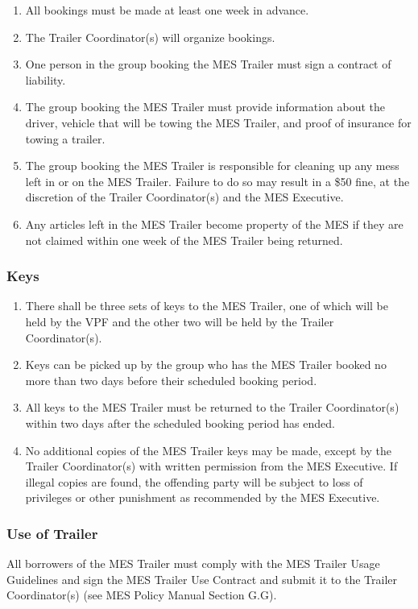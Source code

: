 \begin{enumerate}
 \item
  All bookings must be made at least one week in advance.
 \item
  The Trailer Coordinator(s) will organize bookings.
 \item
  One person in the group booking the MES Trailer must sign a contract
  of liability.
 \item
  The group booking the MES Trailer must provide information about the
  driver, vehicle that will be towing the MES Trailer, and proof of
  insurance for towing a trailer.
 \item
  The group booking the MES Trailer is responsible for cleaning up any
  mess left in or on the MES Trailer. Failure to do so may result in a
  \$50 fine, at the discretion of the Trailer Coordinator(s) and the MES
  Executive.
 \item
  Any articles left in the MES Trailer become property of the MES if
  they are not claimed within one week of the MES Trailer being
  returned.

\end{enumerate}

\hypertarget{keys}{%
 \subsubsection{Keys}
 \label{keys}}
\begin{enumerate}
 \item
  There shall be three sets of keys to the MES Trailer, one of which
  will be held by the VPF and the other two will be held by the Trailer
  Coordinator(s).
 \item
  Keys can be picked up by the group who has the MES Trailer booked no
  more than two days before their scheduled booking period.
 \item
  All keys to the MES Trailer must be returned to the Trailer
  Coordinator(s) within two days after the scheduled booking period has
  ended.
 \item
  No additional copies of the MES Trailer keys may be made, except by
  the Trailer Coordinator(s) with written permission from the MES
  Executive. If illegal copies are found, the offending party will be
  subject to loss of privileges or other punishment as recommended by
  the MES Executive.

\end{enumerate}

\hypertarget{use-of-trailer}{%
 \subsubsection{Use of Trailer}
 \label{use-of-trailer}}
All borrowers of the MES Trailer must comply with the MES Trailer Usage
Guidelines and sign the MES Trailer Use Contract and submit it to the
Trailer Coordinator(s) (see MES Policy Manual Section G.G).

